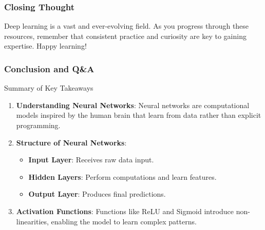 \documentclass[aspectratio=169]{beamer}
\begin{document}
\begin{frame}[fragile]
    \frametitle{Closing Thought}
    Deep learning is a vast and ever-evolving field. As you progress through these resources, remember that consistent practice and curiosity are key to gaining expertise. Happy learning!
\end{frame}

\begin{frame}[fragile]
  \frametitle{Conclusion and Q\&A}
  \begin{block}{Summary of Key Takeaways}
    \begin{enumerate}
      \item \textbf{Understanding Neural Networks}:
      Neural networks are computational models inspired by the human brain that learn from data rather than explicit programming.
      
      \item \textbf{Structure of Neural Networks}:
      \begin{itemize}
        \item \textbf{Input Layer}: Receives raw data input.
        \item \textbf{Hidden Layers}: Perform computations and learn features.
        \item \textbf{Output Layer}: Produces final predictions.
      \end{itemize}
      
      \item \textbf{Activation Functions}:
      Functions like ReLU and Sigmoid introduce non-linearities, enabling the model to learn complex patterns.
    \end{enumerate}
  \end{block}
\end{frame}
\end{document}
